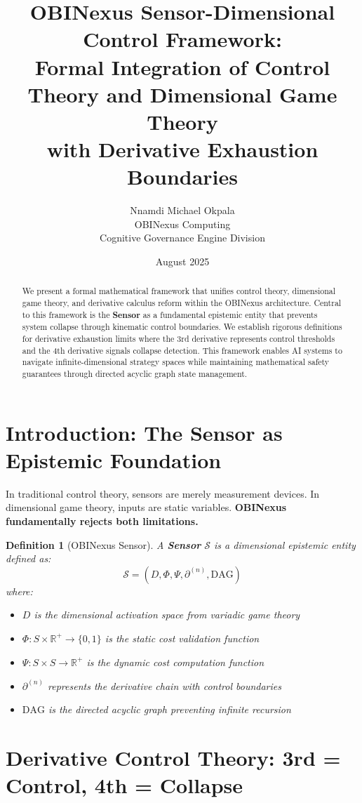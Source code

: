 \documentclass[11pt]{article}
\title{\textbf{OBINexus Sensor-Dimensional Control Framework:} \\ 
Formal Integration of Control Theory and Dimensional Game Theory \\ 
with Derivative Exhaustion Boundaries}
\author{Nnamdi Michael Okpala \\ OBINexus Computing \\ Cognitive Governance Engine Division}
\date{August 2025}
\newtheorem{definition}{Definition}
\begin{document}
\maketitle

\begin{abstract}
We present a formal mathematical framework that unifies control theory, dimensional game theory, and derivative calculus reform within the OBINexus architecture. Central to this framework is the \textbf{Sensor} as a fundamental epistemic entity that prevents system collapse through kinematic control boundaries. We establish rigorous definitions for derivative exhaustion limits where the 3rd derivative represents control thresholds and the 4th derivative signals collapse detection. This framework enables AI systems to navigate infinite-dimensional strategy spaces while maintaining mathematical safety guarantees through directed acyclic graph state management.
\end{abstract}

\section{Introduction: The Sensor as Epistemic Foundation}

In traditional control theory, sensors are merely measurement devices. In dimensional game theory, inputs are static variables. \textbf{OBINexus fundamentally rejects both limitations.}

\begin{definition}[OBINexus Sensor]
A \textbf{Sensor} $\mathcal{S}$ is a dimensional epistemic entity defined as:
$$\mathcal{S} = (D, \Phi, \Psi, \partial^{(n)}, \text{DAG})$$
where:
\begin{itemize}
\item $D$ is the dimensional activation space from variadic game theory
\item $\Phi: S \times \mathbb{R}^+ \rightarrow \{0,1\}$ is the static cost validation function  
\item $\Psi: S \times S \rightarrow \mathbb{R}^+$ is the dynamic cost computation function
\item $\partial^{(n)}$ represents the derivative chain with control boundaries
\item $\text{DAG}$ is the directed acyclic graph preventing infinite recursion
\end{itemize}
\end{definition}

\section{Derivative Control Theory: 3rd = Control, 4th = Collapse}
\end{document}
